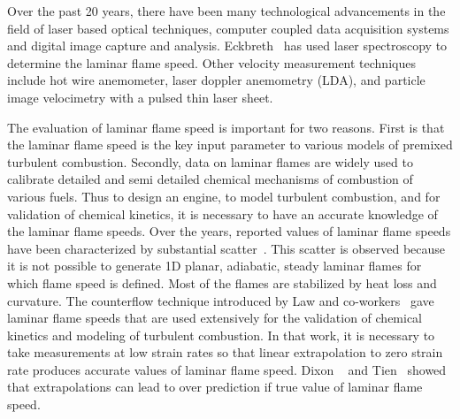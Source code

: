  Over the past 20 years, there have been many technological
advancements in the field of laser based optical techniques, computer
coupled data acquisition systems and digital image capture and
analysis. Eckbreth~\cite{eckbreth} has used laser spectroscopy to
determine the laminar flame speed. Other velocity measurement
techniques include hot wire anemometer, laser doppler anemometry (LDA),
and particle image velocimetry with a pulsed thin laser sheet.


 The evaluation of laminar flame speed is important for 
two reasons. First is that the laminar flame speed is the key
input parameter to various models of premixed turbulent
combustion. Secondly, data on laminar flames are widely used to calibrate
detailed and semi detailed chemical mechanisms of combustion of
various fuels. Thus to design an engine, to model turbulent combustion,
and for validation of chemical kinetics, it is necessary to have an
accurate knowledge of the laminar flame speeds. Over the years,
reported values of laminar flame speeds have been characterized by
substantial scatter~\cite{Andrew}. This scatter is observed because it
is not possible to generate 1D planar, adiabatic, steady laminar
flames for which flame speed is defined. Most of the flames are
stabilized by heat loss and curvature. The counterflow technique
introduced by Law and co-workers~\cite{law} gave laminar flame speeds
that are used extensively for the validation of chemical kinetics and
modeling of turbulent combustion. In that work, it is necessary to
take measurements at low strain rates so that linear extrapolation to
zero strain rate produces accurate values of laminar flame
speed. Dixon ~\cite{dixon} and Tien~\cite{tien} showed that
extrapolations can lead to over prediction if true value of laminar
flame speed.

